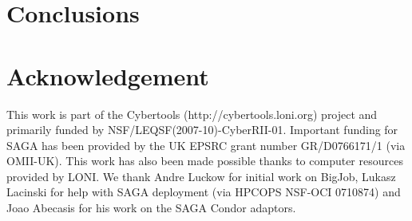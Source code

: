\documentclass[conference,final]{IEEEtran}
\begin{document}
\section{Conclusions}


\section*{Acknowledgement}
This work is part of the Cybertools (http://cybertools.loni.org) project and primarily funded by NSF/LEQSF(2007-10)-CyberRII-01. Important funding for SAGA has been provided by the UK EPSRC grant number GR/D0766171/1 (via OMII-UK).  This work has also been made possible thanks to computer resources provided by LONI.  We thank Andre Luckow for initial work on BigJob, Lukasz Lacinski for help with SAGA deployment (via HPCOPS NSF-OCI 0710874) and Joao Abecasis for his work on the SAGA Condor adaptors. 

\nocite{ex1,ex2}
%


\end{document}
